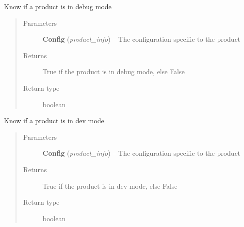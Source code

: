 \documentclass[a4paper,10pt,english]{sphinxmanual}
\begin{document}
\begin{fulllineitems}
\label{commands/apidoc/src:src.product.product_is_debug}
Know if a product is in debug mode
\begin{quote}\begin{description}
\item[{Parameters}] \leavevmode
\textbf{Config} (\emph{product\_info}) -- The configuration specific to 
the product

\item[{Returns}] \leavevmode
True if the product is in debug mode, else False

\item[{Return type}] \leavevmode
boolean

\end{description}\end{quote}

\end{fulllineitems}


\begin{fulllineitems}
\label{commands/apidoc/src:src.product.product_is_dev}
Know if a product is in dev mode
\begin{quote}\begin{description}
\item[{Parameters}] \leavevmode
\textbf{Config} (\emph{product\_info}) -- The configuration specific to 
the product

\item[{Returns}] \leavevmode
True if the product is in dev mode, else False

\item[{Return type}] \leavevmode
boolean

\end{description}\end{quote}

\end{fulllineitems}

\end{document}
